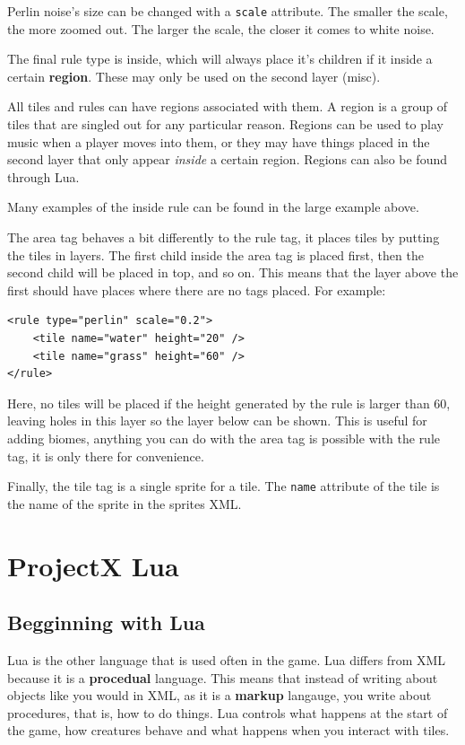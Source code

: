 \documentclass{book}
\begin{document}
Perlin noise's size can be changed with a \texttt{scale} attribute. The smaller the scale, the more zoomed out. The larger the scale, the closer it comes to white noise.

The final rule type is inside, which will always place it's children if it inside a certain \textbf{region}. These may only be used on the second layer (misc).

All tiles and rules can have regions associated with them. A region is a group of tiles that are singled out for any particular reason. Regions can be used to play music when a player moves into them, or they may have things placed in the second layer that only appear \textit{inside} a certain region. Regions can also be found through Lua.

Many examples of the inside rule can be found in the large example above.

The area tag behaves a bit differently to the rule tag, it places tiles by putting the tiles in layers. The first child inside the area tag is placed first, then the second child will be placed in top, and so on. This means that the layer above the first should have places where there are no tags placed. For example:

\begin{verbatim}
<rule type="perlin" scale="0.2">
	<tile name="water" height="20" />
	<tile name="grass" height="60" />
</rule>
\end{verbatim}

Here, no tiles will be placed if the height generated by the rule is larger than 60, leaving holes in this layer so the layer below can be shown. This is useful for adding biomes, anything you can do with the area tag is possible with the rule tag, it is only there for convenience.

Finally, the tile tag is a single sprite for a tile. The \texttt{name} attribute of the tile is the name of the sprite in the sprites XML.

\chapter{ProjectX Lua}
\section{Begginning with Lua}
Lua is the other language that is used often in the game. Lua differs from XML because it is a \textbf{procedual} language. This means that instead of writing about objects like you would in XML, as it is a \textbf{markup} langauge, you write about procedures, that is, how to do things. Lua controls what happens at the start of the game, how creatures behave and what happens when you interact with tiles.
\end{document}
